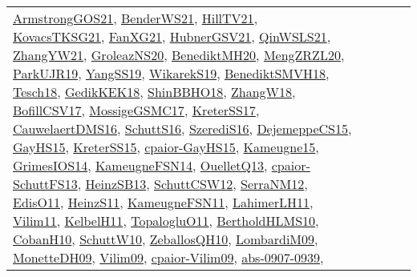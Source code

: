 {\begin{longtable}{lp{3cm}>{\raggedright}p{6cm}>{\raggedright}p{6cm}p{8cm}}
\href{papers/ArmstrongGOS21.pdf}{ArmstrongGOS21}\cite{ArmstrongGOS21}, \href{papers/BenderWS21.pdf}{BenderWS21}\cite{BenderWS21}, \href{papers/HillTV21.pdf}{HillTV21}\cite{HillTV21}, \href{papers/KovacsTKSG21.pdf}{KovacsTKSG21}\cite{KovacsTKSG21}, \href{articles/FanXG21.pdf}{FanXG21}\cite{FanXG21}, \href{articles/HubnerGSV21.pdf}{HubnerGSV21}\cite{HubnerGSV21}, \href{articles/QinWSLS21.pdf}{QinWSLS21}\cite{QinWSLS21}, \href{articles/ZhangYW21.pdf}{ZhangYW21}\cite{ZhangYW21}, \href{papers/GroleazNS20.pdf}{GroleazNS20}\cite{GroleazNS20}, \href{articles/BenediktMH20.pdf}{BenediktMH20}\cite{BenediktMH20}, \href{articles/MengZRZL20.pdf}{MengZRZL20}\cite{MengZRZL20}, \href{papers/ParkUJR19.pdf}{ParkUJR19}\cite{ParkUJR19}, \href{papers/YangSS19.pdf}{YangSS19}\cite{YangSS19}, \href{articles/WikarekS19.pdf}{WikarekS19}\cite{WikarekS19}, \href{papers/BenediktSMVH18.pdf}{BenediktSMVH18}\cite{BenediktSMVH18}, \href{papers/Tesch18.pdf}{Tesch18}\cite{Tesch18}, \href{articles/GedikKEK18.pdf}{GedikKEK18}\cite{GedikKEK18}, \href{articles/ShinBBHO18.pdf}{ShinBBHO18}\cite{ShinBBHO18}, \href{articles/ZhangW18.pdf}{ZhangW18}\cite{ZhangW18}, \href{papers/BofillCSV17.pdf}{BofillCSV17}\cite{BofillCSV17}, \href{papers/MossigeGSMC17.pdf}{MossigeGSMC17}\cite{MossigeGSMC17}, \href{articles/KreterSS17.pdf}{KreterSS17}\cite{KreterSS17}, \href{papers/CauwelaertDMS16.pdf}{CauwelaertDMS16}\cite{CauwelaertDMS16}, \href{papers/SchuttS16.pdf}{SchuttS16}\cite{SchuttS16}, \href{papers/SzerediS16.pdf}{SzerediS16}\cite{SzerediS16}, \href{papers/DejemeppeCS15.pdf}{DejemeppeCS15}\cite{DejemeppeCS15}, \href{papers/GayHS15.pdf}{GayHS15}\cite{GayHS15}, \href{papers/KreterSS15.pdf}{KreterSS15}\cite{KreterSS15}, \href{papers/cpaior-GayHS15.pdf}{cpaior-GayHS15}\cite{cpaior-GayHS15}, \href{articles/Kameugne15.pdf}{Kameugne15}\cite{Kameugne15}, \href{articles/GrimesIOS14.pdf}{GrimesIOS14}\cite{GrimesIOS14}, \href{articles/KameugneFSN14.pdf}{KameugneFSN14}\cite{KameugneFSN14}, \href{papers/OuelletQ13.pdf}{OuelletQ13}\cite{OuelletQ13}, \href{papers/cpaior-SchuttFS13.pdf}{cpaior-SchuttFS13}\cite{cpaior-SchuttFS13}, \href{articles/HeinzSB13.pdf}{HeinzSB13}\cite{HeinzSB13}, \href{papers/SchuttCSW12.pdf}{SchuttCSW12}\cite{SchuttCSW12}, \href{papers/SerraNM12.pdf}{SerraNM12}\cite{SerraNM12}, \href{papers/EdisO11.pdf}{EdisO11}\cite{EdisO11}, \href{papers/HeinzS11.pdf}{HeinzS11}\cite{HeinzS11}, \href{papers/KameugneFSN11.pdf}{KameugneFSN11}\cite{KameugneFSN11}, \href{papers/LahimerLH11.pdf}{LahimerLH11}\cite{LahimerLH11}, \href{papers/Vilim11.pdf}{Vilim11}\cite{Vilim11}, \href{articles/KelbelH11.pdf}{KelbelH11}\cite{KelbelH11}, \href{articles/TopalogluO11.pdf}{TopalogluO11}\cite{TopalogluO11}, \href{papers/BertholdHLMS10.pdf}{BertholdHLMS10}\cite{BertholdHLMS10}, \href{papers/CobanH10.pdf}{CobanH10}\cite{CobanH10}, \href{papers/SchuttW10.pdf}{SchuttW10}\cite{SchuttW10}, \href{articles/ZeballosQH10.pdf}{ZeballosQH10}\cite{ZeballosQH10}, \href{papers/LombardiM09.pdf}{LombardiM09}\cite{LombardiM09}, \href{papers/MonetteDH09.pdf}{MonetteDH09}\cite{MonetteDH09}, \href{papers/Vilim09.pdf}{Vilim09}\cite{Vilim09}, \href{papers/cpaior-Vilim09.pdf}{cpaior-Vilim09}\cite{cpaior-Vilim09}, \href{articles/abs-0907-0939.pdf}{abs-0907-0939}\cite{abs-0907-0939}, 
\end{longtable}}
